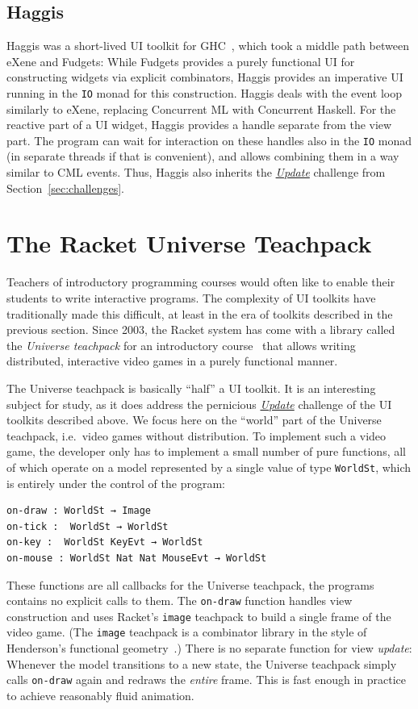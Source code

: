 \documentclass[sigplan,review,screen]{acmart}
\begin{document}
\subsection{Haggis}

Haggis was a short-lived UI toolkit for GHC~\cite{Haggis}, which took
a middle path between eXene and Fudgets: While Fudgets
provides a purely functional UI for constructing widgets via explicit
combinators, Haggis provides an imperative UI running in the
\texttt{IO} monad for this construction.  Haggis deals with the event
loop similarly to eXene, replacing Concurrent ML with Concurrent
Haskell.  For the reactive part of a UI widget, Haggis provides a
handle separate from the view part.  The program can wait for
interaction on these handles also in the \texttt{IO} monad (in
separate threads if that is convenient), and allows combining them in
a way similar to CML events.  Thus, Haggis also inherits the
\hyperlink{challenge:update}{\textit{Update}} challenge from Section~\ref{sec:challenges}.

\section{The Racket Universe Teachpack}
\label{sec:universe-teachpack}

Teachers of introductory programming courses would often like to
enable their students to write interactive programs.  The complexity
of UI toolkits have traditionally made this difficult, at least in the
era of toolkits described in the previous section.  Since 2003, the Racket system
 has come with a library called the \textit{Universe teachpack} for an
introductory course~\cite{UniverseTeachpack} that allows writing
distributed, interactive video games in a purely functional manner.

The Universe teachpack is basically ``half'' a UI toolkit.  It is an
interesting subject for study, as it does address the pernicious \hyperlink{challenge:update}{\textit{Update}}
challenge of the UI toolkits described above.  We focus
here on the ``world'' part of the Universe teachpack, i.e.\ video
games without distribution.  To implement such a video game, the
developer only has to implement a small number of pure functions, all
of which operate on a model represented by
a single value of type \texttt{WorldSt}, which is entirely under the
control of the program:
%
\begin{verbatim}
on-draw : WorldSt → Image
on-tick :  WorldSt → WorldSt
on-key :  WorldSt KeyEvt → WorldSt
on-mouse : WorldSt Nat Nat MouseEvt → WorldSt
\end{verbatim}
%
These functions are all callbacks for the Universe teachpack, the
programs contains no explicit calls to them.
The \texttt{on-draw} function handles view construction and uses Racket's
\texttt{image} teachpack to build a single frame of the video game.
(The \texttt{image} teachpack is a combinator library in the style of
Henderson's functional geometry~\cite{Henderson1982}.)  There is no
separate function for view \emph{update}: Whenever the model
transitions to a new state, the Universe teachpack simply calls
\texttt{on-draw} again and redraws the \emph{entire} frame.  This is
fast enough in practice to achieve reasonably fluid animation.
\end{document}
